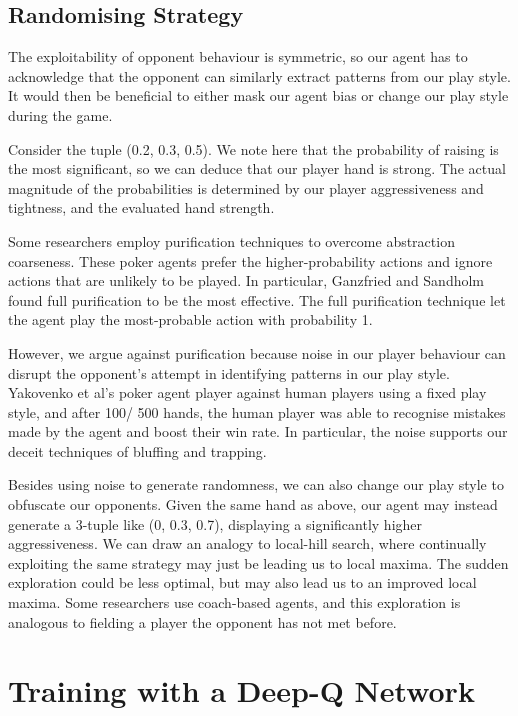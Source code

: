 \documentclass{article}
\begin{document}
\subsection{Randomising Strategy}

The exploitability of opponent behaviour is symmetric, so our agent has to acknowledge that the opponent can similarly extract patterns from our play style. It would then be beneficial to either mask our agent bias or change our play style during the game.

Consider the tuple (0.2, 0.3, 0.5). We note here that the probability of raising is the most significant, so we can deduce that our player hand is strong. The actual magnitude of the probabilities is determined by our player aggressiveness and tightness, and the evaluated hand strength.

Some researchers employ purification techniques to overcome abstraction coarseness. These poker agents prefer the higher-probability actions and ignore actions that are unlikely to be played. In particular, Ganzfried and Sandholm found full purification to be the most effective. The full purification technique let the agent play the most-probable action with probability 1.

However, we argue against purification because noise in our player behaviour can disrupt the opponent's attempt in identifying patterns in our play style. Yakovenko et al's poker agent player against human players using a fixed play style, and after 100/ 500 hands, the human player was able to recognise mistakes made by the agent and boost their win rate. In particular, the noise supports our deceit techniques of bluffing and trapping.

Besides using noise to generate randomness, we can also change our play style to obfuscate our opponents. Given the same hand as above, our agent may instead generate a 3-tuple like (0, 0.3, 0.7), displaying a significantly higher aggressiveness. We can draw an analogy to local-hill search, where continually exploiting the same strategy may just be leading us to local maxima. The sudden exploration could be less optimal, but may also lead us to an improved local maxima. Some researchers use coach-based agents, and this exploration is analogous to fielding a player the opponent has not met before.

\section{Training with a Deep-Q Network}
\end{document}
